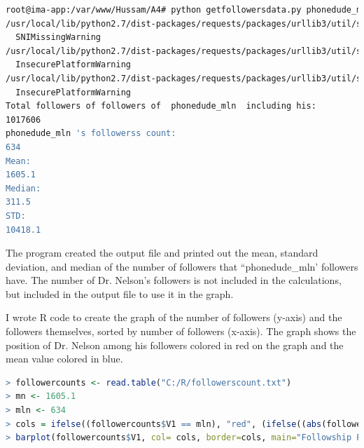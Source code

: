\documentclass[a4paper, 11pt]{article}
\begin{document}
\begin{lstlisting}[language=bash, breakatwhitespace=〈false), label=Running getfollowers.py, caption= Running getfollowersdata.py]
root@ima-app:/var/www/Hussam/A4# python getfollowersdata.py phonedude_mln
/usr/local/lib/python2.7/dist-packages/requests/packages/urllib3/util/ssl_.py:334: SNIMissingWarning: An HTTPS request has been made, but the SNI (Subject Name Indication) extension to TLS is not available on this platform. This may cause the server to present an incorrect TLS certificate, which can cause validation failures. You can upgrade to a newer version of Python to solve this. For more information, see https://urllib3.readthedocs.io/en/latest/advanced-usage.html#ssl-warnings
  SNIMissingWarning
/usr/local/lib/python2.7/dist-packages/requests/packages/urllib3/util/ssl_.py:132: InsecurePlatformWarning: A true SSLContext object is not available. This prevents urllib3 from configuring SSL appropriately and may cause certain SSL connections to fail. You can upgrade to a newer version of Python to solve this. For more information, see https://urllib3.readthedocs.io/en/latest/advanced-usage.html#ssl-warnings
  InsecurePlatformWarning
/usr/local/lib/python2.7/dist-packages/requests/packages/urllib3/util/ssl_.py:132: InsecurePlatformWarning: A true SSLContext object is not available. This prevents urllib3 from configuring SSL appropriately and may cause certain SSL connections to fail. You can upgrade to a newer version of Python to solve this. For more information, see https://urllib3.readthedocs.io/en/latest/advanced-usage.html#ssl-warnings
  InsecurePlatformWarning
Total followers of followers of  phonedude_mln  including his:
1017606
phonedude_mln 's followerss count:
634
Mean:
1605.1
Median:
311.5
STD:
10418.1
\end{lstlisting}

The program created the output file and printed out the mean, standard deviation, and median of the number of followers that ``phonedude\_mln' followers have. The number of Dr. Nelson's followers is not included in the calculations, but included in the output file to use it in the graph.

I wrote R code to create the graph of the number of followers (y-axis) and the followers themselves, sorted by number of followers (x-axis). The graph shows the position of Dr. Nelson among his followers colored in red on the graph and the mean value colored in blue.  

\begin{lstlisting}[language=R, breakatwhitespace=〈false), label=Followship Paradox graph code in R, caption= Followship Paradox graph code in R]
> followercounts <- read.table("C:/R/followerscount.txt")
> mn <- 1605.1
> mln <- 634
> cols = ifelse((followercounts$V1 == mln), "red", (ifelse((abs(followercounts$V1 - mn) < 21), "blue" , "orange")))
> barplot(followercounts$V1, col= cols, border=cols, main="Followship Paradox", xlab="Followers", ylab = "Number of Followers", log="y")
\end{lstlisting}
\end{document}
